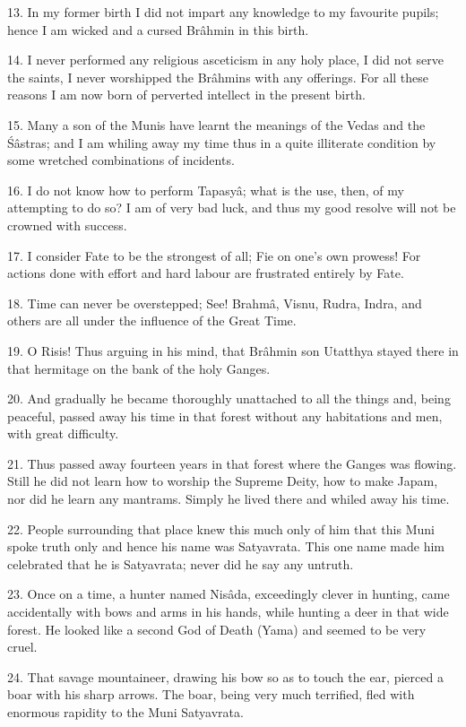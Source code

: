 13. In my former birth I did not impart any knowledge to my favourite pupils; hence I am wicked and a cursed Br\^ahmin in this birth.

14. I never performed any religious asceticism in any holy place, I did not serve the saints, I never worshipped the Br\^ahmins with any offerings. For all these reasons I am now born of perverted intellect in the present birth.

15. Many a son of the Munis have learnt the meanings of the Vedas and the \'S\^astras; and I am whiling away my time thus in a quite illiterate condition by some wretched combinations of incidents.

16. I do not know how to perform Tapasy\^a; what is the use, then, of my attempting to do so? I am of very bad luck, and thus my good resolve will not be crowned with success.

17. I consider Fate to be the strongest of all; Fie on one's own prowess! For actions done with effort and hard labour are frustrated entirely by Fate.

18. Time can never be overstepped; See! Brahm\^a, Visnu, Rudra, Indra, and others are all under the influence of the Great Time.

19. O Risis! Thus arguing in his mind, that Br\^ahmin son Utatthya stayed there in that hermitage on the bank of the holy Ganges.

20. And gradually he became thoroughly unattached to all the things and, being peaceful, passed away his time in that forest without any habitations and men, with great difficulty.

21. Thus passed away fourteen years in that forest where the Ganges was flowing. Still he did not learn how to worship the Supreme Deity, how to make Japam, nor did he learn any mantrams. Simply he lived there and whiled away his time.

22. People surrounding that place knew this much only of him that this Muni spoke truth only and hence his name was Satyavrata. This one name made him celebrated that he is Satyavrata; never did he say any untruth.

23. Once on a time, a hunter named Nis\^ada, exceedingly clever in hunting, came accidentally with bows and arms in his hands, while hunting a deer in that wide forest. He looked like a second God of Death (Yama) and seemed to be very cruel.

24. That savage mountaineer, drawing his bow so as to touch the ear, pierced a boar with his sharp arrows. The boar, being very much terrified, fled with enormous rapidity to the Muni Satyavrata.

